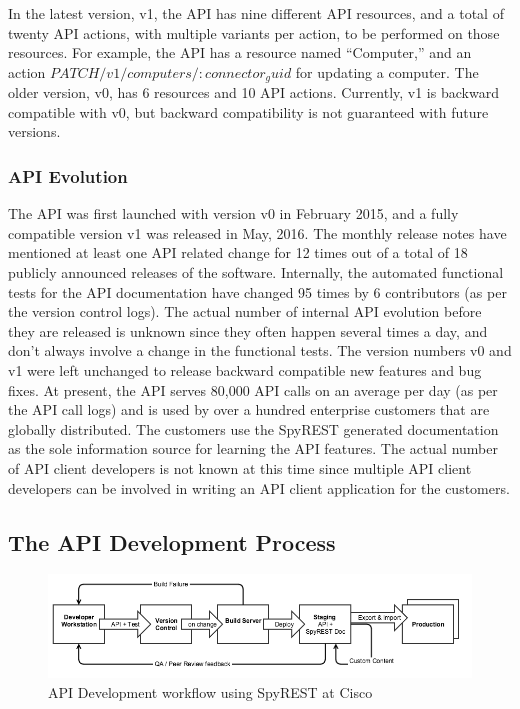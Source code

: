 In the latest version, v1, the API has nine different API resources, and a total of twenty API actions, with multiple variants per action, to be performed on those resources. For example, the API has a resource named ``Computer,'' and an action $PATCH /v1/computers/{:connector_guid}$ for updating a computer. The older version, v0, has 6 resources and 10 API actions. Currently, v1 is backward compatible with v0, but backward compatibility is not guaranteed with future versions.

\subsubsection{API Evolution}
The API was first launched with version v0 in February 2015, and a fully compatible version v1 was released in May, 2016. The monthly release notes have mentioned at least one API related change for 12 times out of a total of 18 publicly announced releases of the software. Internally, the automated functional tests for the API documentation have changed 95 times by 6 contributors (as per the version control logs). The actual number of internal API evolution before they are released is unknown since they often happen several times a day, and don't always involve a change in the functional tests. The version numbers v0 and v1 were left unchanged to release backward compatible new features and bug fixes. At present, the API serves 80,000 API calls on an average per day (as per the API call logs) and is  used by over a hundred enterprise customers that are globally distributed. The customers use the SpyREST generated documentation as the sole information source for learning the API features. The actual number of API client developers is not known at this time since multiple API client developers can be involved in writing an API client application for the customers.

\subsection{The API Development Process} %
\begin{figure}[t]
\begin{center}
\includegraphics[width=18cm,keepaspectratio]{spyrestflow.png}
\end{center}
\caption{API Development workflow using SpyREST at Cisco}
\label{fig:spyrest_workflow}
\end{figure}


